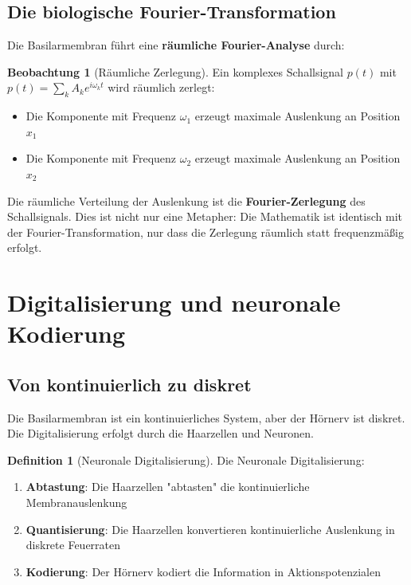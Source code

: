 ﻿\documentclass[a4paper,12pt]{report}
\theoremstyle{definition}
\newtheorem{definition}{Definition}
\newtheorem{beobachtung}{Beobachtung}
\begin{document}
	\subsection{Die biologische Fourier-Transformation}
	
	Die Basilarmembran führt eine \textbf{räumliche Fourier-Analyse} durch:
	
	\begin{beobachtung}[Räumliche Zerlegung]
		Ein komplexes Schallsignal $p(t)$ mit $p(t) = \sum_k A_k e^{i\omega_k t}$ wird räumlich zerlegt:
		\begin{itemize}
			\item[-] Die Komponente mit Frequenz $\omega_1$ erzeugt maximale Auslenkung an Position $x_1$
			\item[-] Die Komponente mit Frequenz $\omega_2$ erzeugt maximale Auslenkung an Position $x_2$
		\end{itemize}
		Die räumliche Verteilung der Auslenkung ist die \textbf{Fourier-Zerlegung} des Schallsignals. Dies ist nicht nur eine Metapher: Die Mathematik ist identisch mit der Fourier-Transformation, nur dass die Zerlegung räumlich statt frequenzmäßig erfolgt.
	\end{beobachtung}
	
	\section{Digitalisierung und neuronale Kodierung}
	
	\subsection{Von kontinuierlich zu diskret}
	
	Die Basilarmembran ist ein kontinuierliches System, aber der Hörnerv ist diskret. Die Digitalisierung erfolgt durch die Haarzellen und Neuronen.
	
	\begin{definition}[Neuronale Digitalisierung]
		Die Neuronale Digitalisierung:
		\begin{enumerate}
			\item[-] \textbf{Abtastung}: Die Haarzellen "abtasten" die kontinuierliche Membranauslenkung
			\item[-] \textbf{Quantisierung}: Die Haarzellen konvertieren kontinuierliche Auslenkung in diskrete Feuerraten
			\item[-] \textbf{Kodierung}: Der Hörnerv kodiert die Information in Aktionspotenzialen
		\end{enumerate}
	\end{definition}
	
\end{document}
